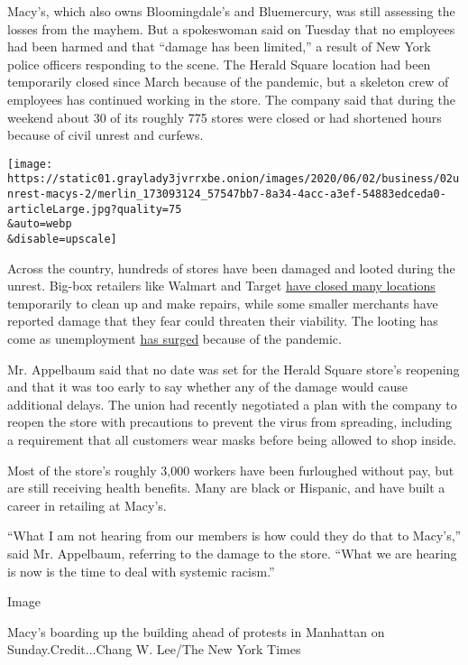 Macy's, which also owns Bloomingdale's and Bluemercury, was still
assessing the losses from the mayhem. But a spokeswoman said on Tuesday
that no employees had been harmed and that ``damage has been limited,''
a result of New York police officers responding to the scene. The Herald
Square location had been temporarily closed since March because of the
pandemic, but a skeleton crew of employees has continued working in the
store. The company said that during the weekend about 30 of its roughly
775 stores were closed or had shortened hours because of civil unrest
and curfews.

\texttt{[image: https://static01.graylady3jvrrxbe.onion/images/2020/06/02/business/02unrest-macys-2/merlin\_173093124\_57547bb7-8a34-4acc-a3ef-54883edceda0-articleLarge.jpg?quality=75\\\&auto=webp\\\&disable=upscale]}

Across the country, hundreds of stores have been damaged and looted
during the unrest. Big-box retailers like Walmart and Target
\href{https://www.nytimes3xbfgragh.onion/2020/06/01/business/stores-protests-damage.html}{have
closed many locations} temporarily to clean up and make repairs, while
some smaller merchants have reported damage that they fear could
threaten their viability. The looting has come as unemployment
\href{https://www.nytimes3xbfgragh.onion/interactive/2020/05/08/business/economy/april-jobs-report.html}{has
surged} because of the pandemic.

Mr. Appelbaum said that no date was set for the Herald Square store's
reopening and that it was too early to say whether any of the damage
would cause additional delays. The union had recently negotiated a plan
with the company to reopen the store with precautions to prevent the
virus from spreading, including a requirement that all customers wear
masks before being allowed to shop inside.

Most of the store's roughly 3,000 workers have been furloughed without
pay, but are still receiving health benefits. Many are black or
Hispanic, and have built a career in retailing at Macy's.

``What I am not hearing from our members is how could they do that to
Macy's,'' said Mr. Appelbaum, referring to the damage to the store.
``What we are hearing is now is the time to deal with systemic racism.''

Image

Macy's boarding up the building ahead of protests in Manhattan on
Sunday.Credit...Chang W. Lee/The New York Times

